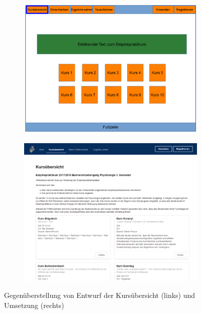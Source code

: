         \begin{figure}
            \centering
            \begin{subfigure}{0.49\textwidth}
                \includegraphics[width=1.0\textwidth]{./implementation/images/MockUpsFrontend/frontendCourses.png}
            \end{subfigure}
            \begin{subfigure}{0.49\textwidth}
                \includegraphics[width=1.0\textwidth]{./implementation/images/courses.png}
            \end{subfigure}
            \caption{Gegenüberstellung von Entwurf der Kursübersicht (links) und Umsetzung (rechts)}
            \label{fig:comparisonCourses}
        \end{figure}
    
